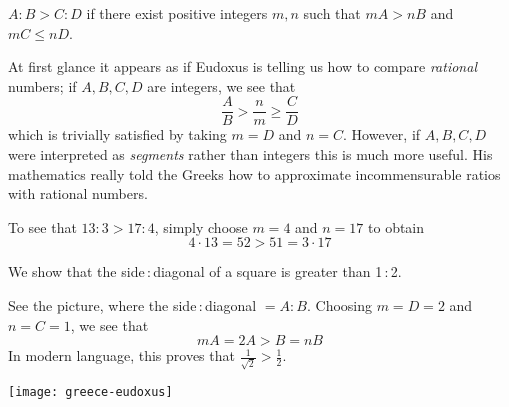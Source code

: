 \begin{defn*}{}{}
	$A:B>C:D$ if there exist positive integers $m,n$ such that $mA>nB$ and $mC\le nD$.
\end{defn*}

At first glance it appears as if Eudoxus is telling us how to compare \emph{rational} numbers; if $A,B,C,D$ are integers, we see that
\[
	\frac AB>\frac nm\ge \frac CD
\]
which is trivially satisfied by taking $m=D$ and $n=C$. However, if $A,B,C,D$ were interpreted as \emph{segments} rather than integers this is much more useful. His mathematics really told the Greeks how to approximate incommensurable ratios with rational numbers.


\exstart To see that $13:3>17:4$, simply choose $m=4$ and $n=17$ to obtain
  \[4\cdot 13=52>51=3\cdot 17\]

\begin{enumerate}\setcounter{enumi}{1}
  \begin{minipage}[t]{0.68\linewidth}\vspace{-10pt}
    \item We show that the side\,:\,diagonal of a square is greater than 1\,:\,2.\par
    See the picture, where the side\,:\,diagonal $=A:B$. Choosing $m=D=2$ and $n=C=1$, we see that
  	\[
  		mA=2A>B=nB \tag{diag $>$ side of large square}
  	\]
  	In modern language, this proves that $\frac 1{\sqrt 2}>\frac 12$.
  \end{minipage}
  \hfill
  \begin{minipage}[t]{0.31\linewidth}\vspace{-10pt}
  	\flushright
  	\texttt{[image: greece-eudoxus]}
  \end{minipage}
\end{enumerate}


\label{pg:zeno}

